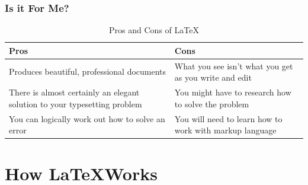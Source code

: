 \documentclass{beamer}
\begin{document}
\begin{frame}
\frametitle{Is it For Me?}

\begin{table}
\begin{tabularx}{\textwidth}{X|X}
Pros & Cons \\
\hline
Produces beautiful, professional documents & What you see isn’t what you get as you write and edit \\ 
There is almost certainly an elegant solution to your typesetting problem & You might have to research how to solve the problem \\
You can logically work out how to solve an error & You will need to learn how to work with markup language \\
\end{tabularx}
\caption{Pros and Cons of \LaTeX}
\end{table}

\end{frame}

\section{How \LaTeX Works}

\begin{frame}


\end{frame}
\end{document}
